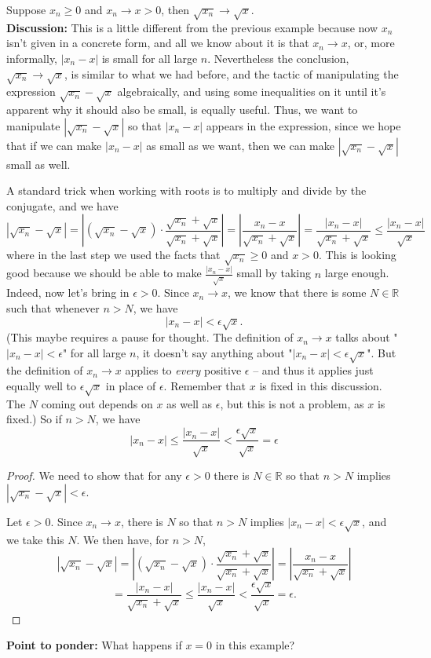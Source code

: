 \documentclass[11pt,dvipsnames]{book}
\def\R{\mathbb{R}}
\numberwithin{figure}{section} %
\numberwithin{table}{section} %
\begin{document}
\begin{example}\label{sqrootxn}
Suppose $x_{n}\geq 0$ and $x_{n}\rightarrow x>0$, then $\sqrt{x_{n}}\rightarrow \sqrt{x}$. \\

{\bf Discussion:} This is a little different from the previous example because now $x_n$ isn't given in a concrete form, and all we know about it is that $x_n \rightarrow x$, or, more informally, $|x_n - x|$ is small for all large $n$. Nevertheless the conclusion, $\sqrt{x_{n}}\rightarrow \sqrt{x}$, is similar to what we had before, and the tactic of manipulating the expression $\sqrt{x_{n}}-\sqrt{x}$ algebraically, and using some inequalities on it until it's apparent why it should also be small, is equally useful. Thus, we want to manipulate $|\sqrt{x_{n}}-\sqrt{x}|$ so that $|x_{n}-x|$ appears in the expression, since we hope that if we can make $|x_{n}-x|$ as small as we want, then we can make $|\sqrt{x_{n}}-\sqrt{x}|$ small as well.

A standard trick when working with roots is to multiply and divide by the conjugate, and we have
\[
|\sqrt{x_{n}}-\sqrt{x}|
=\left|(\sqrt{x_{n}}-\sqrt{x})\cdot \frac{\sqrt{x_{n}}+\sqrt{x}}{\sqrt{x_{n}}+\sqrt{x}}\right|
=\left|\frac{x_{n}-x}{\sqrt{x_{n}}+\sqrt{x}}\right|
=\frac{|x_{n}-x|}{\sqrt{x_{n}}+\sqrt{x}} \leq \frac{|x_{n}-x|}{\sqrt{x}}
\]
where in the last step we used the facts that $\sqrt{x_n} \geq 0$ and $x > 0$. This is looking good because we should be able to make
$\frac{|x_{n}-x|}{\sqrt{x}}$ small by taking $n$ large enough. Indeed, now let's bring in $\epsilon > 0$. Since $x_n \rightarrow x$, we know that there is some $N \in \mathbb{R}$ such that whenever $n > N$,
we have
\[ |x_n - x| <\epsilon\sqrt{x}.\]
(This maybe requires a pause for thought. The definition of $x_n \rightarrow x$ talks about "$|x_n - x| < \epsilon$" for all large $n$, it doesn't say anything about "$ |x_n - x| <\epsilon\sqrt{x}$". But the definition of $x_n \rightarrow x$ applies to {\em every} positive $\epsilon$ -- and thus it applies just equally well to $\epsilon\sqrt{x}$
in place of $\epsilon$. Remember that $x$ is fixed in this discussion. The $N$ coming out depends on $x$ as well as $\epsilon$, but this is not a problem, as $x$ is fixed.)
So if $n > N$, we have
\[|x_n - x| \leq \frac{|x_n - x|}{\sqrt{x}} < \frac{\epsilon\sqrt{x}}{\sqrt{x}} = \epsilon
\]

\begin{proof}
We need to show that for any $\epsilon>0$ there is $N \in \R$ so that $n> N$ implies $|\sqrt{x_{n}}-\sqrt{x}|<\epsilon$.

Let $\epsilon>0$. Since $x_n\rightarrow x$, there is $N$ so that $n> N$ implies $|x_{n}-x|<\epsilon\sqrt{x}$, and we take this $N$. We then have, for $n > N$,
\[
|\sqrt{x_{n}}-\sqrt{x}|
=\left|(\sqrt{x_{n}}-\sqrt{x})\cdot \frac{\sqrt{x_{n}}+\sqrt{x}}{\sqrt{x_{n}}+\sqrt{x}}\right|
=\left|\frac{x_{n}-x}{\sqrt{x_{n}}+\sqrt{x}}\right|\]
\[=\frac{|x_{n}-x|}{\sqrt{x_{n}}+\sqrt{x}}
\leq \frac{|x_{n}-x|}{\sqrt{x}}
< \frac{\epsilon \sqrt{x}}{\sqrt{x}} = \epsilon.
\]
\end{proof}
\end{example}
{\bf Point to ponder:} What happens if $x = 0$ in this example?
\end{document}
